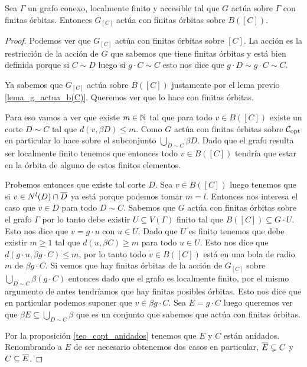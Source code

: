 \documentclass[tesis.tex]{subfiles}
\begin{document}
\begin{lema}
	Sea $\Gamma$ un grafo conexo, localmente finito y accesible tal que $G$ actúa sobre $\Gamma$ con finitas órbitas.
	Entonces $G_{[C]}$ actúa con finitas órbitas sobre $B([C])$.
\end{lema}
\begin{proof}
	Podemos ver que $G_{[C]}$ actúa con finitas órbitas sobre $[C]$.
	La acción es la restricción de la acción de $G$ que sabemos que tiene finitas órbitas y está bien definida porque si $C \sim D$ luego si $g \cdot C \sim C$ esto nos dice que $g \cdot D \sim g \cdot C \sim C$.
	
	Ya sabemos que $G_{[C]}$ actúa sobre $B([C])$ justamente por el lema previo \ref{lema_g_actua_b(C)}.
	Queremos ver que lo hace con finitas órbitas.
	
	Para eso vamos a ver que existe $m \in \mathbb{N}$ tal que para todo $v \in B([C])$ existe un corte $D \sim C$ tal que $d(v,\beta D) \le m$.
	Como $G$ actúa con finitas órbitas sobre ${\cal C}_{\text{opt}}$ en particular lo hace sobre el subconjunto $\bigcup_{D \sim C} \beta D$.
	Dado que el grafo resulta ser localmente finito tenemos que entonces todo $v \in B([C])$ tendría que estar en la órbita de alguno de estos finitos elementos.
	
	Probemos entonces que existe tal corte $D$.
	Sea $v \in B([C])$ luego tenemos que si $v \in N^l(D) \cap \overline D$ ya está porque podemos tomar $m=l$.
	Entonces nos interesa el caso que $v \in D$ para todo $D \sim C$.
	Sabemos que $G$ actúa con finitas órbitas sobre el grafo $\Gamma$ por lo tanto debe existir $U \subseteq V(\Gamma)$ finito tal que $B([C]) \subseteq G \cdot U$.
	Esto nos dice que $v = g \cdot u$ con $u \in U$.
	Dado que $U$ es finito tenemos que debe existir $m \ge 1$ tal que $d(u,\beta C) \ge m$ para todo $u \in U$.
	Esto nos dice que $d(g \cdot u, \beta g \cdot C) \le m$, por lo tanto todo $v \in B([C])$ está en una bola de radio $m$ de $\beta g \cdot C$.
	Si vemos que hay finitas órbitas de la acción de $G_{[C]}$ sobre $\bigcup_{D \sim C} \beta (g \cdot C)$ entonces dado que el grafo es localmente finito, por el mismo argumento de antes tendríamos que hay finitas posibles órbitas.
	Esto nos dice que en particular podemos suponer que $v \in \beta g \cdot C$.
	Sea $E = g \cdot C$ luego queremos ver que $\beta E \subseteq \bigcup_{D \sim C} \beta $ que es un conjunto que sabemos que actúa con finitas órbitas.
	
	Por la proposición \ref{teo_copt_anidados} tenemos que $E$ y $C$ están anidados.
	Renombrando a $E$ de ser necesario obtenemos dos casos en particular, $\overline E \subsetneq C$ y $C \subseteq \overline E$.
	

\end{proof}
\end{document}
